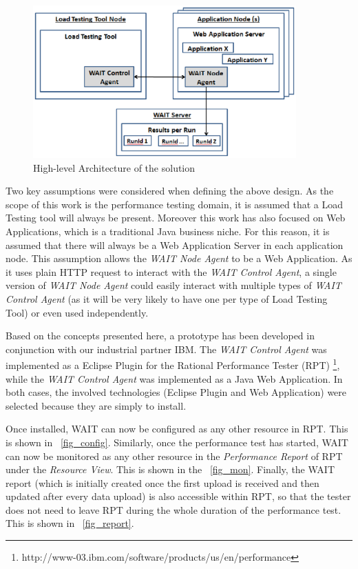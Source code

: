 \documentclass[runningheads,a4paper]{llncs}
\begin{document}
\begin{figure}[!h]
\centering
\includegraphics[totalheight=.3\textheight,width=0.9\textwidth]{architecture_dwait}
\caption{High-level Architecture of the solution}
\label{fig_Arch}
\end{figure}

Two key assumptions were considered when defining the above design. As the scope
of this work is the performance testing domain, it is assumed that a Load
Testing tool will always be present. Moreover this work has also focused on Web
Applications, which is a traditional Java business niche. For this reason, it is
assumed that there will always be a Web Application Server in each application
node. This assumption allows the \emph{WAIT Node Agent} to be a Web Application.
As it uses plain HTTP request to interact with the \emph{WAIT Control Agent}, a
single version of \emph{WAIT Node Agent} could easily interact with multiple
types of \emph{WAIT Control Agent} (as it will be very likely to have one per
type of Load Testing Tool) or even used independently.

Based on the concepts presented here, a prototype has been developed in
conjunction with our industrial partner IBM. The \emph{WAIT Control Agent} was
implemented as a Eclipse Plugin for the Rational Performance Tester (RPT)
\footnote{http://www-03.ibm.com/software/products/us/en/performance},
while the \emph{WAIT Control Agent} was implemented as a Java Web Application.
In both cases, the involved technologies (Eclipse Plugin and Web Application)
were selected because they are simply to install.

Once installed, WAIT can now be configured as any other resource in RPT. This is
shown in \figurename ~\ref{fig_config}. Similarly, once the performance test has started, WAIT can now be monitored as any other resource in the
\emph{Performance Report} of RPT under the \emph{Resource View}. This is shown
in the \figurename ~\ref{fig_mon}. Finally, the WAIT report (which is initially created 
once the first upload is received and then updated after every data
upload) is also accessible within RPT, so that the tester does not need to
leave RPT during the whole duration of the performance test. This is shown
in \figurename ~\ref{fig_report}.
\end{document}
